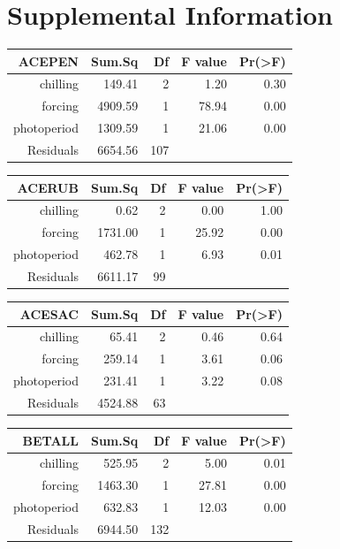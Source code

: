 \documentclass{article}\usepackage[]{graphicx}\usepackage[]{color}
\begin{document}
\section*{Supplemental Information}
\begin{table}[ht]
\centering
\begin{tabular}{rrrrr}
  \hline
  ACEPEN & Sum.Sq & Df & F value & Pr(>F) \\
 \hline
chilling & 149.41 &   2 & 1.20 & 0.30 \\ 
  forcing & 4909.59 &   1 & 78.94 & 0.00 \\ 
  photoperiod & 1309.59 &   1 & 21.06 & 0.00 \\ 
  Residuals & 6654.56 & 107 &  &  \\ 
   \hline
\end{tabular}
\end{table}
\begin{table}[ht]
\centering
\begin{tabular}{rrrrr}
  \hline
  ACERUB & Sum.Sq & Df & F value & Pr(>F) \\
 \hline
chilling & 0.62 &   2 & 0.00 & 1.00 \\ 
  forcing & 1731.00 &   1 & 25.92 & 0.00 \\ 
  photoperiod & 462.78 &   1 & 6.93 & 0.01 \\ 
  Residuals & 6611.17 &  99 &  &  \\ 
   \hline
\end{tabular}
\end{table}
\begin{table}[ht]
\centering
\begin{tabular}{rrrrr}
  \hline
  ACESAC & Sum.Sq & Df & F value & Pr(>F) \\
 \hline
chilling & 65.41 &   2 & 0.46 & 0.64 \\ 
  forcing & 259.14 &   1 & 3.61 & 0.06 \\ 
  photoperiod & 231.41 &   1 & 3.22 & 0.08 \\ 
  Residuals & 4524.88 &  63 &  &  \\ 
   \hline
\end{tabular}
\end{table}
\begin{table}[ht]
\centering
\begin{tabular}{rrrrr}
  \hline
  BETALL & Sum.Sq & Df & F value & Pr(>F) \\
 \hline
chilling & 525.95 &   2 & 5.00 & 0.01 \\ 
  forcing & 1463.30 &   1 & 27.81 & 0.00 \\ 
  photoperiod & 632.83 &   1 & 12.03 & 0.00 \\ 
  Residuals & 6944.50 & 132 &  &  \\ 
   \hline
\end{tabular}
\end{table}
\end{document}
